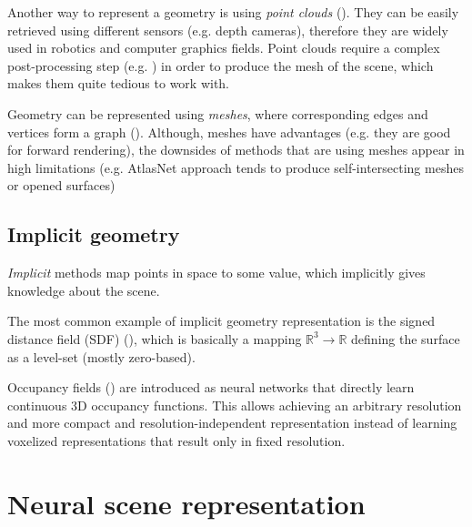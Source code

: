 Another way to represent a geometry is using \textit{point clouds} (\cite{qi2017pointnet, fan2016point}).
They can be easily retrieved using different sensors (e.g. depth cameras),
therefore they are widely used in robotics and computer graphics fields.
Point clouds require a complex post-processing step
(e.g. \cite{ballpivoting1999bernardini}) in order to produce the mesh of the scene,
which makes them quite tedious to work with.

Geometry can be represented using \textit{meshes},
where corresponding edges and vertices form a graph (\cite{wang20183d}).
Although, meshes have advantages (e.g. they are good for forward rendering),
the downsides of methods that are using meshes appear in high limitations
(e.g. AtlasNet approach \cite{groueix2018atlasnet} tends to produce self-intersecting meshes or opened surfaces)

\subsection{Implicit geometry}

\textit{Implicit} methods map points in space to some value,
which implicitly gives knowledge about the scene.

The most common example of implicit geometry representation is the signed distance field (SDF) (\cite{truncdistfield1996curless, Lombardi_2019}),
which is basically a mapping $\mathbb{R}^3 \xrightarrow{} \mathbb{R}$ defining the surface as a level-set (mostly zero-based).

Occupancy fields (\cite{occupancy2019mescheder}) are introduced as neural networks
that directly learn continuous 3D occupancy functions.
This allows achieving an arbitrary resolution and more compact and resolution-independent representation
instead of learning voxelized representations
that result only in fixed resolution.






\section{Neural scene representation}

